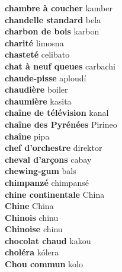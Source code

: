 \textbf{ chambre à coucher  } kamber \\
\textbf{ chandelle standard  } bela \\
\textbf{ charbon de bois  } karbon \\
\textbf{ charité  } limosna \\
\textbf{ chasteté  } celibato \\
\textbf{ chat à neuf queues  } carbachi \\
\textbf{ chaude-pisse  } aploudí \\
\textbf{ chaudière  } boiler \\
\textbf{ chaumière  } kasita \\
\textbf{ chaîne de télévision  } kanal \\
\textbf{ chaîne des Pyrénées  } Pirineo \\
\textbf{ chaîne  } pipa \\
\textbf{ chef d’orchestre  } direktor \\
\textbf{ cheval d’arçons  } cabay \\
\textbf{ chewing-gum  } bals \\
\textbf{ chimpanzé  } chimpansé \\
\textbf{ chine continentale  } China \\
\textbf{ Chine  } China \\
\textbf{ Chinois  } chinu \\
\textbf{ Chinoise  } chinu \\
\textbf{ chocolat chaud  } kakou \\
\textbf{ choléra  } kólera \\
\textbf{ Chou commun  } kolo \\
